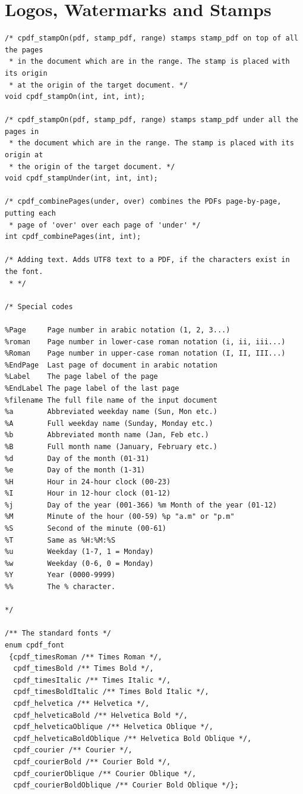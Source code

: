 \documentclass[a4paper]{memoir}
\begin{document}
\chapter{Logos, Watermarks and Stamps}
\begin{small}
\begin{lstlisting}
/* cpdf_stampOn(pdf, stamp_pdf, range) stamps stamp_pdf on top of all the pages
 * in the document which are in the range. The stamp is placed with its origin
 * at the origin of the target document. */
void cpdf_stampOn(int, int, int);

/* cpdf_stampOn(pdf, stamp_pdf, range) stamps stamp_pdf under all the pages in
 * the document which are in the range. The stamp is placed with its origin at
 * the origin of the target document. */
void cpdf_stampUnder(int, int, int);

/* cpdf_combinePages(under, over) combines the PDFs page-by-page, putting each
 * page of 'over' over each page of 'under' */
int cpdf_combinePages(int, int);

/* Adding text. Adds UTF8 text to a PDF, if the characters exist in the font.
 * */

/* Special codes

%Page     Page number in arabic notation (1, 2, 3...)
%roman    Page number in lower-case roman notation (i, ii, iii...)
%Roman    Page number in upper-case roman notation (I, II, III...)
%EndPage  Last page of document in arabic notation
%Label    The page label of the page
%EndLabel The page label of the last page
%filename The full file name of the input document
%a        Abbreviated weekday name (Sun, Mon etc.)
%A        Full weekday name (Sunday, Monday etc.)
%b        Abbreviated month name (Jan, Feb etc.)
%B        Full month name (January, February etc.)
%d        Day of the month (01-31)
%e        Day of the month (1-31)
%H        Hour in 24-hour clock (00-23)
%I        Hour in 12-hour clock (01-12)
%j        Day of the year (001-366) %m Month of the year (01-12)
%M        Minute of the hour (00-59) %p "a.m" or "p.m"
%S        Second of the minute (00-61)
%T        Same as %H:%M:%S
%u        Weekday (1-7, 1 = Monday)
%w        Weekday (0-6, 0 = Monday)
%Y        Year (0000-9999)
%%        The % character.

*/

/** The standard fonts */
enum cpdf_font
 {cpdf_timesRoman /** Times Roman */,
  cpdf_timesBold /** Times Bold */,
  cpdf_timesItalic /** Times Italic */,
  cpdf_timesBoldItalic /** Times Bold Italic */,
  cpdf_helvetica /** Helvetica */,
  cpdf_helveticaBold /** Helvetica Bold */,
  cpdf_helveticaOblique /** Helvetica Oblique */,
  cpdf_helveticaBoldOblique /** Helvetica Bold Oblique */,
  cpdf_courier /** Courier */,
  cpdf_courierBold /** Courier Bold */,
  cpdf_courierOblique /** Courier Oblique */,
  cpdf_courierBoldOblique /** Courier Bold Oblique */};


\end{lstlisting}
\end{small}
\end{document}

